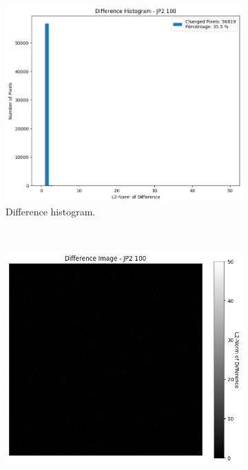 \begin{figure}[htb]
\begin{subfigure}[b]{0.48\textwidth}
        \includegraphics[width=\textwidth]{doc/thesis/0_figures/compare_quality/set1/jp2_100_center_diff_histogram.png}
        \caption{Difference histogram.}
        \label{fig:img_quality_comp_jp2_100_center_histo}
    \end{subfigure}
    \\
    \begin{subfigure}[b]{0.48\textwidth}
        \centering
        \includegraphics[width=\textwidth]{doc/thesis/0_figures/compare_quality/set1/jp2_100_center_diff_heatmap.png}

\end{subfigure}
\end{figure}
